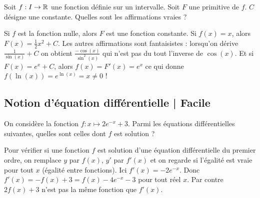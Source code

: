 \begin{question}
Soit $f : I \to \mathbb{R}$ une fonction définie sur un intervalle. Soit $F$ une primitive de $f$.
$C$ désigne une constante.
Quelles sont les affirmations vraies ?
\begin{answers}  
\end{answers}
\begin{explanations}
Si $f$ est la fonction nulle, alors $F$ est une fonction constante.
Si $f(x)=x$, alors $F(x) = \frac12 x^2+ C$. Les autres affirmations sont fantaisistes : lorsqu'on dérive $\frac{1}{\sin(x)} + C$ on obtient $\frac{-\cos(x)}{\sin^2(x)}$ qui n'est pas du tout l'inverse de $\cos(x)$. Et si $F(x) = e^x + C$, alors $f(x) = F'(x) = e^x$ ce qui donne $f(\ln(x)) = e^{\ln(x)} = x \neq 0$ !
\end{explanations}
\end{question}



\subsection{Notion d'équation différentielle | Facile}


\begin{question}
On considère la fonction $f:x\mapsto 2 e^{-x}+3$. Parmi les équations différentielles suivantes, quelles sont celles dont $f$ est solution ?
\begin{answers}  
\end{answers}
\begin{explanations}
Pour vérifier si une fonction \(f\) est solution d'une équation différentielle du premier ordre, on 	remplace \(y\) par \(f(x)\), \(y'\) par \(f'(x)\) et on regarde si l'égalité est vraie pour tout \(x\) (égalité entre fonctions). Ici \(f'(x)=-2 e^{-x}\). Donc \(f'(x)=-f(x)+3=f(x)-4 e^{-x}-3\) pour tout réel \(x\). Par contre \(2f(x)+3\) n'est pas la même fonction que \( f'(x)\).
\end{explanations}
\end{question}


